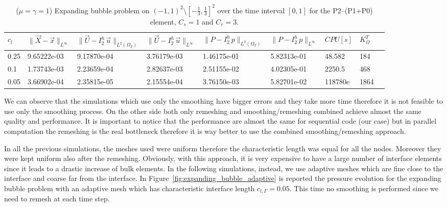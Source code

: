 \documentclass[a4paper,12pt,onecolumn]{article}
\newcommand{\errorXx}{\|\vec{X} - \vec{x}\|_{L^\infty}}
\newcommand{\LerrorUu}[1]{\|\vec U - I^h_{#1}\,\vec u\|_{L^2(\Omega_T)}}
\newcommand{\errorUu}[1]{\|\vec U - I^h_{#1}\,\vec u\|_{L^\infty}}
\newcommand{\errorPp}[1]{\|P - I^h_{#1}\,p\|_{L^\infty}}
\newcommand{\LerrorPp}[1]{\|P - I^h_{#1}\,p\|_{L^2(\Omega_T)}}
\begin{document}
\begin{table}
 \center
 \hspace*{-2cm}
\begin{tabular}{lllllllll}
\hline
$c_l$ & $\errorXx$ & $\LerrorUu2$ & $\errorUu2$ & $\LerrorPp2$ & $\errorPp2$ & $CPU[s]$ & $K_\Omega^T$\\
\hline
0.25 & 9.65222e-03 & 9.17870e-04 & 3.76179e-03 & 1.46175e-01 & 5.82313e-01 & 48.582 & 184\\
0.1 & 1.73743e-03 & 2.23659e-04 & 2.82637e-03 & 2.51155e-02 & 4.02305e-01 & 2250.5 & 468\\
0.05 & 3.66902e-04 & 2.35815e-05 & 2.15554e-04 & 3.76150e-03 & 5.82701e-02 & 118780e & 1864\\
\hline
\end{tabular}
\hspace*{-2cm}
\caption{($\mu=\gamma=1$) Expanding bubble problem on $(-1,1)^2\setminus[-\frac{1}{3},\frac{1}{3}]^2$ over the time interval $[0,1]$ for the P2--(P1+P0) element, $C_s=1$ and $C_r=3$.}
\label{tab:expandingbubble2Dp2p1p0all}
\end{table}

We can observe that the simulations which use only the smoothing have bigger errors and they take more time therefore it is not feasible to use only the smoothing process. On the other side both only remeshing and smoothing/remeshing combined achieve almost the same quality and performance. It is important to notice that the performance are almost the same for sequential code (our case) but in parallel computation the remeshing is the real bottleneck therefore it is way better to use the combined smoothing/remeshing approach.  
\newline

In all the previous simulations, the meshes used were uniform therefore the characteristic length was equal for all the nodes. Moreover they were kept uniform also after the remeshing. Obviously, with this approach, it is very expensive to have a large number of interface elements since it leads to a drastic increase of bulk elements. In the following simulations, instead, we use adaptive meshes which are fine close to the interface and coarse far from the interface. In Figure~\ref{fig:expanding_bubble_adaptive} is reported the pressure evolution for the expanding bubble problem with an adaptive mesh which has characteristic interface length $c_{l,\Gamma}=0.05$. This time no smoothing is performed since we need to remesh at each time step.
\end{document}
